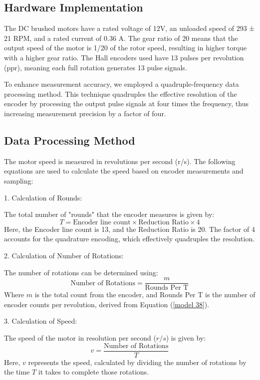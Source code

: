 \documentclass[journal,onecolumn]{IEEEtran}
\begin{document}
\subsection{Hardware Implementation}

The DC brushed motors have a rated voltage of 12V, an unloaded speed of 293 ± 21 RPM, and a rated current of 0.36 A. The gear ratio of 20 means that the output speed of the motor is 1/20 of the rotor speed, resulting in higher torque with a higher gear ratio. The Hall encoders used have 13 pulses per revolution (ppr), meaning each full rotation generates 13 pulse signals. 

To enhance measurement accuracy, we employed a quadruple-frequency data processing method. This technique quadruples the effective resolution of the encoder by processing the output pulse signals at four times the frequency, thus increasing measurement precision by a factor of four.

\subsection{Data Processing Method}

The motor speed is measured in revolutions per second (r/s). The following equations are used to calculate the speed based on encoder measurements and sampling:

1. Calculation of Rounds:

   The total number of "rounds" that the encoder measures is given by:
   \begin{equation}
       \label{model 37}
       T = \text{Encoder line count} \times \text{Reduction Ratio} \times 4
   \end{equation}
   Here, the Encoder line count is 13, and the Reduction Ratio is 20. The factor of 4 accounts for the quadrature encoding, which effectively quadruples the resolution.

2. Calculation of Number of Rotations:

   The number of rotations can be determined using:
   \begin{equation}
       \label{model 38}
       \text{Number of Rotations} = \frac{m}{\text{Rounds Per T}}
   \end{equation}
   Where \( m \) is the total count from the encoder, and Rounds Per T is the number of encoder counts per revolution, derived from Equation (\ref{model 38}).

3. Calculation of Speed:

   The speed of the motor in resolution per second (\( r/s \)) is given by:
   \begin{equation}
       \label{model 39}
       v = \frac{\text{Number of Rotations}}{T}
   \end{equation}
   Here, \( v \) represents the speed, calculated by dividing the number of rotations by the time \( T \) it takes to complete those rotations.
\end{document}
